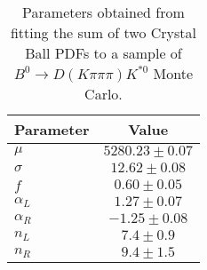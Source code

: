 \begin{table}[h]
  \centering
  \begin{tabular}{lc}
      \toprule
      Parameter & Value \\
      \midrule
      $\mu$ & $5280.23 \pm 0.07$ \\
      $\sigma$ & $12.62 \pm 0.08$ \\
      $f$ & $0.60 \pm 0.05$ \\
      $\alpha_L$ & $1.27 \pm 0.07$ \\
      $\alpha_R$ & $-1.25 \pm 0.08$ \\
      $n_L$ & $7.4 \pm 0.9$ \\
      $n_R$ & $9.4 \pm 1.5$ \\
  \bottomrule
  \end{tabular}
  \caption{Parameters obtained from fitting the sum of two Crystal Ball PDFs to a sample of $B^0 \to D(K\pi\pi\pi)K^{*0}$ Monte Carlo.}
\label{tab:signal_Kpipipi_MC_params}
\end{table}
